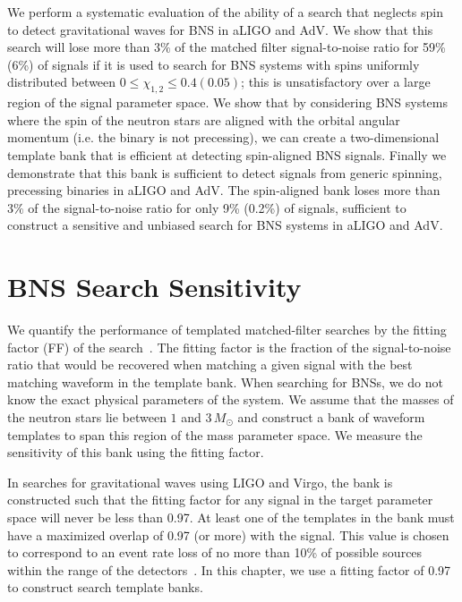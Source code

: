 We perform a systematic evaluation of the ability
of a search that neglects spin to detect gravitational waves for BNS in aLIGO
and AdV.  We show that this search will lose more than $3\%$ of the
matched filter signal-to-noise ratio for 59\% (6\%) of signals if it is used to search
for BNS systems with spins uniformly distributed between $0 \le \chi_{1,2} \le
0.4 (0.05)$; this is unsatisfactory over a
large region of the signal parameter space. We show that by considering BNS
systems where the spin of the neutron stars are aligned with the orbital
angular momentum (i.e. the binary is not precessing), we can create a
two-dimensional template bank that is efficient at detecting spin-aligned BNS
signals. Finally we demonstrate that this bank is sufficient to detect signals
from generic spinning, precessing binaries in aLIGO and AdV. The spin-aligned
bank loses more than $3\%$ of the signal-to-noise ratio for only 9\% (0.2\%)
of signals, sufficient to construct a sensitive and unbiased search for BNS
systems in aLIGO and AdV.

\section{BNS Search Sensitivity}
\label{ssec:nonspin_performance}
\label{sec:spin_import}

We quantify the performance of templated matched-filter searches by the
fitting factor (FF) of the search~\cite{Apostolatos:1995pj}.  The fitting
factor is the fraction of the signal-to-noise ratio that would be recovered
when matching a given signal with the best matching waveform in the template
bank. When searching for BNSs, we do not know the exact physical parameters of the
system. We assume that the masses of the neutron stars lie between $1$ and
$3\, M_\odot$ and construct a bank of waveform templates to span this
region of the mass parameter space. We measure the sensitivity of this bank 
using the fitting factor.

In searches for gravitational waves using LIGO and Virgo, the bank is constructed
such that the fitting factor for any signal in the target parameter space will
never be less than 0.97. At least one of the templates in the bank must have a
maximized overlap of 0.97 (or more) with the signal. This value is chosen to
correspond to an event rate loss of no more than 10\% of possible sources
within the range of the detectors~\cite{Cutler:1992tc}. In this chapter, we use
a fitting factor of 0.97 to construct search template banks.

